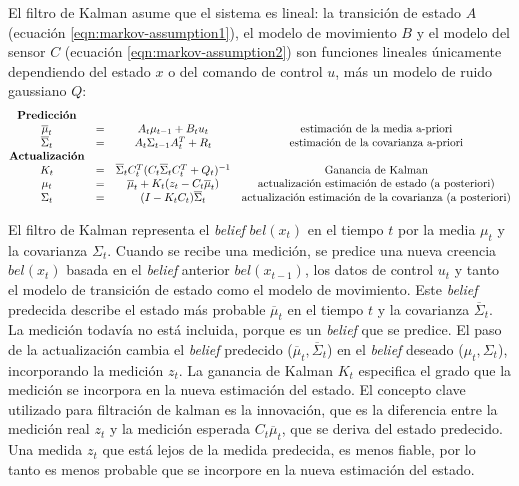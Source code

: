 El filtro de Kalman asume que el sistema es lineal: la transición de estado $A$ (ecuación \ref{eqn:markov-assumption1}), el modelo de movimiento $B$ y el modelo del sensor $C$ (ecuación \ref{eqn:markov-assumption2}) son funciones lineales únicamente dependiendo del estado $x$ o del comando de control $u$, más un modelo de ruido gaussiano $Q$:
\begin{equation}
\label{eqn: Kalman Filter}
\begin{matrix}
\textrm{\textbf{Predicción}}\\
\overline{\mu}_{t} &= &A_{t}\mu_{t-1} + B_{t} u_{t} &\textrm{estimación de la media a-priori}\\
\overline{\Sigma}_{t} &= &A_{t}\Sigma_{t-1} A_{t}^{T} + R_{t} &\textrm{estimación de la covarianza a-priori}\\
\textrm{\textbf{Actualización}}\\
K_{t} &= &\overline{\Sigma}_{t}C_{t}^{T}(C_{t}\overline{\Sigma}_{t}C_{t}^{T} + Q_{t})^{-1} &\textrm{Ganancia de Kalman}\\
\mu_{t} &= &\overline{\mu}_{t} + K_{t}(z_{t} - C_{t}\overline{\mu}_{t}) &\textrm{actualización estimación de estado (a posteriori)}\\
\Sigma_{t} &= &(I - K_{t}C_{t})\overline{\Sigma}_{t} &\textrm{actualización estimación de la covarianza (a posteriori)}\\
\end{matrix}
\end{equation}

El filtro de Kalman representa el \textit{belief} $bel(x_{t})$ en el tiempo $t$ por la media $\mu_{t}$ y la covarianza $\Sigma_{t}$. Cuando se recibe una medición, se predice una nueva creencia $bel(x_{t})$ basada en el \textit{belief} anterior $bel(x_{t-1})$, los datos de control $u_{t}$ y tanto el modelo de transición de estado como el modelo de movimiento. Este \textit{belief} predecida describe el estado más probable $\overline{\mu}_{t}$ en el tiempo $t$ y la covarianza $\overline{\Sigma}_{t}$. La medición todavía no está incluida, porque es un \textit{belief} que se predice. El paso de la actualización cambia el \textit{belief} predecido ($\overline{\mu}_{t},\overline{\Sigma}_{t}$) en el \textit{belief} deseado ($\mu_{t},\Sigma_{t}$), incorporando la medición $z_{t}$. La ganancia de Kalman $K_{t}$ especifica el grado que la medición se incorpora en la nueva estimación del estado. El concepto clave utilizado para filtración de kalman es la innovación, que es la diferencia entre la medición real $z_{t}$ y la medición esperada $C_{t}\overline{\mu}_{t}$, que se deriva del estado predecido. Una medida $z_{t}$ que está lejos de la medida predecida, es menos fiable, por lo tanto es menos probable que se incorpore en la nueva estimación del estado.


